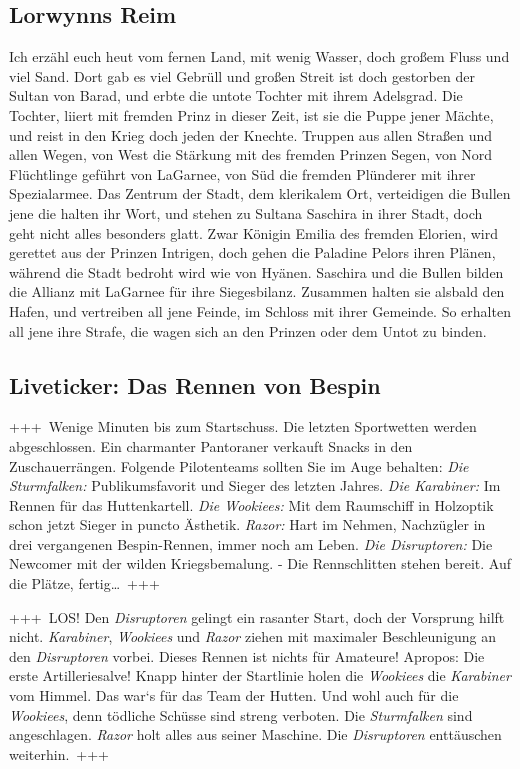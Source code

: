\subsection{Lorwynns Reim}
Ich erzähl euch heut vom fernen Land, mit wenig Wasser, doch großem Fluss und viel Sand.
Dort gab es viel Gebrüll und großen Streit ist doch gestorben der Sultan von Barad, und erbte die untote Tochter mit ihrem Adelsgrad.
Die Tochter, liiert mit fremden Prinz in dieser Zeit, ist sie die Puppe jener Mächte, und reist in den Krieg doch jeden der Knechte.
Truppen aus allen Straßen und allen Wegen, von West die Stärkung mit des fremden Prinzen Segen, von Nord Flüchtlinge geführt von LaGarnee, von Süd die fremden Plünderer mit ihrer Spezialarmee.
Das Zentrum der Stadt, dem klerikalem Ort, verteidigen die Bullen jene die halten ihr Wort, und stehen zu Sultana Saschira in ihrer Stadt, doch geht nicht alles besonders glatt.
Zwar Königin Emilia des fremden Elorien, wird gerettet aus der Prinzen Intrigen, doch gehen die Paladine Pelors ihren Plänen, während die Stadt bedroht wird wie von Hyänen.
Saschira und die Bullen bilden die Allianz mit LaGarnee für ihre Siegesbilanz.
Zusammen halten sie alsbald den Hafen, und vertreiben all jene Feinde, im Schloss mit ihrer Gemeinde.
So erhalten all jene ihre Strafe, die wagen sich an den Prinzen oder dem Untot zu binden.

\subsection{Liveticker: Das Rennen von Bespin}
+++~Wenige Minuten bis zum Startschuss.
    Die letzten Sportwetten werden abgeschlossen.
    Ein charmanter Pantoraner verkauft Snacks in den Zuschauerrängen.
    Folgende Pilotenteams sollten Sie im Auge behalten:
    \textit{Die Sturmfalken:} Publikumsfavorit und Sieger des letzten Jahres.
    \textit{Die Karabiner:} Im Rennen für das Huttenkartell.
    \textit{Die Wookiees:} Mit dem Raumschiff in Holzoptik schon jetzt Sieger in puncto Ästhetik.
    \textit{Razor:} Hart im Nehmen, Nachzügler in drei vergangenen Bespin-Rennen, immer noch am Leben.
    \textit{Die Disruptoren:} Die Newcomer mit der wilden Kriegsbemalung.
    - Die Rennschlitten stehen bereit.
    Auf die Plätze, fertig…~+++

+++~LOS!
    Den \textit{Disruptoren} gelingt ein rasanter Start, doch der Vorsprung hilft nicht.
    \textit{Karabiner}, \textit{Wookiees} und \textit{Razor} ziehen mit maximaler Beschleunigung an den \textit{Disruptoren} vorbei.
    Dieses Rennen ist nichts für Amateure!
    Apropos: Die erste Artilleriesalve!
    Knapp hinter der Startlinie holen die \textit{Wookiees} die \textit{Karabiner} vom Himmel.
    Das war‘s für das Team der Hutten.
    Und wohl auch für die \textit{Wookiees}, denn tödliche Schüsse sind streng verboten.
    Die \textit{Sturmfalken} sind angeschlagen.
    \textit{Razor} holt alles aus seiner Maschine.
    Die \textit{Disruptoren} enttäuschen weiterhin.~+++

